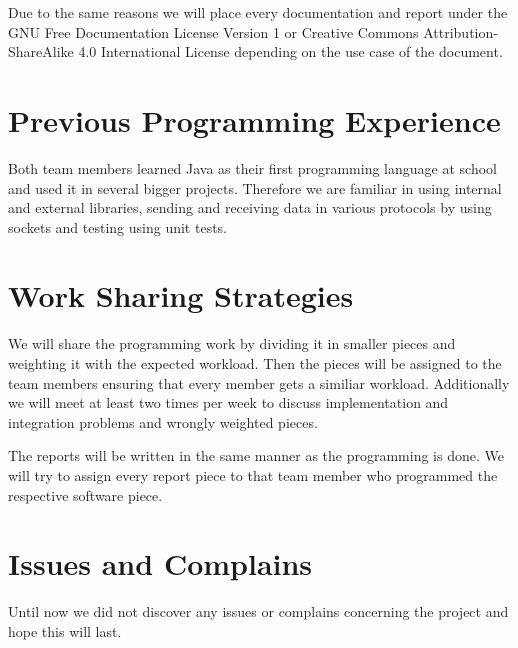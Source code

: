 \documentclass{article}
\begin{document}
Due to the same reasons we will place every documentation and report under the
GNU Free Documentation License Version 1 or Creative Commons
Attribution-ShareAlike 4.0 International License depending on the use case of
the document.

\section{Previous Programming Experience} 
Both team members learned Java as their first programming language at school and
used it in several bigger projects. Therefore we are familiar in using internal
and external libraries, sending and receiving data in various protocols by
using sockets and testing using unit tests.

\section{Work Sharing Strategies}
We will share the programming work by dividing it in smaller pieces and
weighting it with the expected workload. Then the pieces will be assigned to
the team members ensuring that every member gets a similiar workload.
Additionally we will meet at least two times per week to discuss implementation
and integration problems and wrongly weighted pieces.

The reports will be written in the same manner as the programming is done. We
will try to assign every report piece to that team member who programmed the
respective software piece.

\section{Issues and Complains}
Until now we did not discover any issues or complains concerning the project
and hope this will last.
\end{document}
